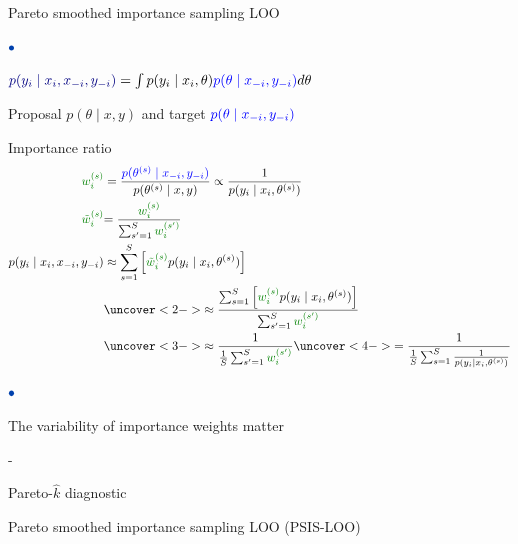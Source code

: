 \documentclass[english,t]{beamer}
\newenvironment{list1}{
   \begin{list}{$\color{list1}\bullet$}{\itemsep=6pt}}{
  \end{list}}
\newenvironment{list2}{
  \begin{list}{-}{\baselineskip=12pt\itemsep=2pt}}{
  \end{list}}
\begin{document}
\begin{frame}{Pareto smoothed importance sampling LOO}

  \vspace{-0.7\baselineskip}
  \begin{list1}
  \item ${\color{navyblue}p(y_i \mid x_i,x_{-i}, y_{-i})} = \int p(y_i \mid x_i,\theta){\color{blue} p(\theta \mid x_{-i}, y_{-i})} d\theta$
  \item Proposal $p(\theta \mid x,y)$ and target ${\color{blue} p(\theta \mid x_{-i}, y_{-i})}$
  \item Importance ratio
    \begin{align*}
    {\color{darkgreen} w_i^{(s)}} & = \frac{{\color{blue} p(\theta^{(s)} \mid x_{-i}, y_{-i})}}{p(\theta^{(s)} \mid x,y)}\propto \frac{1}{p(y_i \mid x_i,\theta^{(s)})}\\
      {\color{darkgreen}\tilde{w}_i^{(s)}}&{=\frac{{\color{darkgreen} w_i^{(s)}}}{\sum_{s'=1}^S {\color{darkgreen} w_i^{(s')}}}}\\
      p(y_i \mid x_i,x_{-i},y_{-i}) & \approx \sum_{s=1}^S \left[{\color{darkgreen}  \tilde{w}_i^{(s)}} p(y_i \mid x_i,\theta^{(s)})\right] \\
                                  & \uncover<2->{\approx  \frac {\sum_{s=1}^S \left[{\color{darkgreen}  {w}_i^{(s)}} p(y_i \mid x_i,\theta^{(s)})\right]}{\sum_{s'=1}^S {\color{darkgreen} w_i^{(s')}}}} \\
                                  & \uncover<3->{\approx \frac{1}{\frac{1}{S}\sum_{s'=1}^S {\color{darkgreen} w_i^{(s')}}} } \uncover<4->{ = \frac{1}{\frac{1}{S}\sum_{s=1}^S {\frac{1}{p(y_i \mid x_i,\theta^{(s)})}}} }
    \end{align*}
  \end{list1}

  \begin{list1}
  \item The variability of importance weights matter
    \begin{list2}
    \item Pareto-$\hat{k}$ diagnostic
    \item Pareto smoothed importance sampling LOO (PSIS-LOO)
    \end{list2}
  \end{list1}
\end{frame}
\end{document}

